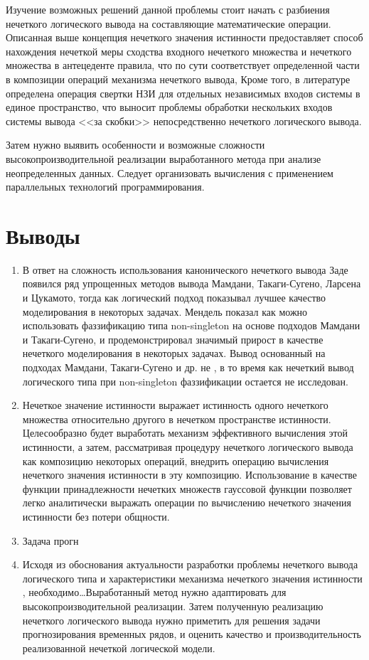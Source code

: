 Изучение возможных решений данной проблемы стоит начать с разбиения нечеткого логического вывода на составляющие математические операции. Описанная выше концепция нечеткого значения истинности предоставляет способ нахождения нечеткой меры сходства входного нечеткого множества и нечеткого множества в антецеденте правила, что по сути соответствует определенной части в композиции операций механизма нечеткого вывода, Кроме того, в литературе определена операция свертки НЗИ для отдельных независимых входов системы в единое пространство, что выносит проблемы обработки нескольких входов системы вывода <<за скобки>> непосредственно нечеткого логического вывода.

Затем нужно выявить особенности и возможные сложности высокопроизводительной реализации выработанного метода при анализе неопределенных данных. Следует организовать вычисления с применением параллельных технологий программирования.


\section{Выводы}

\begin{enumerate}
	\item В ответ на сложность использования канонического нечеткого вывода Заде появился ряд упрощенных методов вывода Мамдани, Такаги-Сугено, Ларсена и Цукамото, тогда как логический подход показывал лучшее качество моделирования в некоторых задачах. Мендель показал как можно использовать фаззификацию типа non-singleton на основе подходов Мамдани и Такаги-Сугено, и продемонстрировал значимый прирост в качестве нечеткого моделирования в некоторых задачах. Вывод основанный на подходах Мамдани, Такаги-Сугено и др. не , в то время как нечеткий вывод логического типа при non-singleton фаззификации остается не исследован.
	\item Нечеткое значение истинности выражает истинность одного нечеткого множества относительно другого в нечетком пространстве истинности. Целесообразно будет выработать механизм эффективного вычисления этой истинности, а затем, рассматривая процедуру нечеткого логического вывода как композицию некоторых операций, внедрить операцию вычисления нечеткого значения истинности в эту композицию. Использование в качестве функции принадлежности нечетких множеств гауссовой функции позволяет легко аналитически выражать операции по вычислению нечеткого значения истинности без потери общности.
	\item Задача прогн
	\item Исходя из обоснования актуальности разработки проблемы нечеткого вывода логического типа и характеристики механизма нечеткого значения истинности , необходимо\dots Выработанный метод нужно адаптировать для высокопроизводительной реализации. Затем полученную реализацию нечеткого логического вывода нужно приметить для решения задачи прогнозирования временных рядов, и оценить качество и производительность реализованной нечеткой логической модели.
\end{enumerate}

\FloatBarrier
